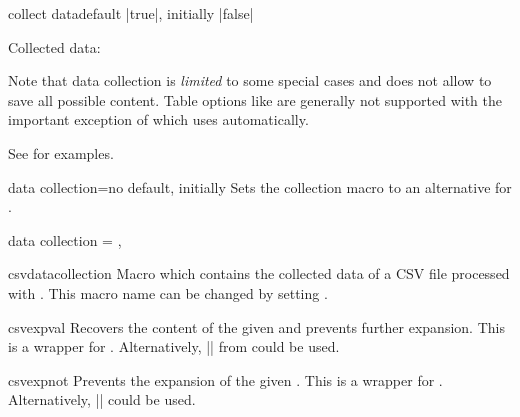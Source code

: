 \documentclass[a4paper,11pt]{ltxdoc}
\begin{document}
\begin{docCsvKey}[][doc new=2021-07-06]{collect data}{}{default |true|, initially |false|}
\begin{dispExample}
Collected data:\par
\csvdatacollection
\end{dispExample}

Note that data collection is \emph{limited} to some special cases and does not
allow to save all possible content. Table options like 
are generally not supported with the important exception of 
which uses  automatically.\par
See  for examples.
\end{docCsvKey}

\clearpage

\begin{docCsvKey}[][doc new=2021-07-06]{data collection}{=}{no default, initially }
Sets the collection macro to an alternative for .
\begin{dispListing}
  data collection = \myData,    %
\end{dispListing}
\end{docCsvKey}


\begin{docCommand}[doc new=2021-07-06]{csvdatacollection}{}
  Macro which contains the collected data of a CSV file processed with
  . This macro name can be changed by
  setting .
\end{docCommand}


\begin{docCommand}[doc new=2021-07-06]{csvexpval}{}
  Recovers the content of the given  and prevents further
  expansion. This is a wrapper for .
  Alternatively, |\expandonce| from  could be used.
\end{docCommand}


\begin{docCommand}[doc new=2021-07-06]{csvexpnot}{}
  Prevents the expansion of the given . This is a wrapper
  for .
  Alternatively, |\noexpand| could be used.
\end{docCommand}
\end{document}
